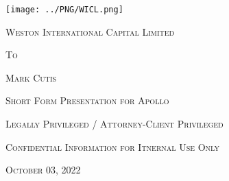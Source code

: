 \begin{titlepage}
    \clearpage\thispagestyle{empty}
    \thispagestyle{plain}

    
    \begin{center}
        \texttt{[image: ../PNG/WICL.png]}
        \vspace{1cm}
    \end{center}

    \begin{center}
        \Huge \textsc{Weston International Capital Limited}
        \vspace{0.5cm}
    \end{center}

    \begin{center}
        \Large \textsc{To}
        \vspace{0.5cm}
    \end{center}

    \begin{center}
        \Huge \textsc{Mark Cutis}
        \vspace{0.5cm}
    \end{center}
    \begin{center}
        \Large \textsc{Short Form Presentation for Apollo}
        \vspace{0.5cm}
    \end{center}
    \begin{center}
        \large\textsc{Legally Privileged / Attorney-Client Privileged}
    \end{center}
    \begin{center}
        \large\textsc{Confidential Information for Itnernal Use Only}
    \end{center}
    \begin{center}
        \vspace{0.5cm}
        \large\textsc{October 03, 2022}
    \end{center}

\end{titlepage}

\begingroup
\let\cleardoublepage\clearpage
\tableofcontents
\endgroup
\newpage
